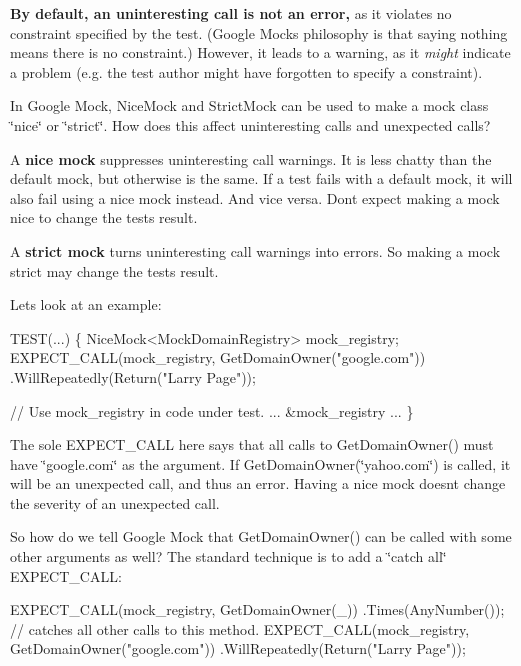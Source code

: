 {\bfseries By default, an uninteresting call is not an error,} as it violates no constraint specified by the test. (Google Mock\textquotesingle{}s philosophy is that saying nothing means there is no constraint.) However, it leads to a warning, as it {\itshape might} indicate a problem (e.\+g. the test author might have forgotten to specify a constraint).

In Google Mock, {\ttfamily Nice\+Mock} and {\ttfamily Strict\+Mock} can be used to make a mock class \char`\"{}nice\char`\"{} or \char`\"{}strict\char`\"{}. How does this affect uninteresting calls and unexpected calls?

A {\bfseries nice mock} suppresses uninteresting call warnings. It is less chatty than the default mock, but otherwise is the same. If a test fails with a default mock, it will also fail using a nice mock instead. And vice versa. Don\textquotesingle{}t expect making a mock nice to change the test\textquotesingle{}s result.

A {\bfseries strict mock} turns uninteresting call warnings into errors. So making a mock strict may change the test\textquotesingle{}s result.

Let\textquotesingle{}s look at an example\+:


\begin{DoxyCode}
TEST(...) \{
  NiceMock<MockDomainRegistry> mock\_registry;
  EXPECT\_CALL(mock\_registry, GetDomainOwner(\textcolor{stringliteral}{"google.com"}))
          .WillRepeatedly(Return(\textcolor{stringliteral}{"Larry Page"}));

  \textcolor{comment}{// Use mock\_registry in code under test.}
  ... &mock\_registry ...
\}
\end{DoxyCode}


The sole {\ttfamily E\+X\+P\+E\+C\+T\+\_\+\+C\+A\+LL} here says that all calls to {\ttfamily Get\+Domain\+Owner()} must have {\ttfamily \char`\"{}google.\+com\char`\"{}} as the argument. If {\ttfamily Get\+Domain\+Owner(\char`\"{}yahoo.\+com\char`\"{})} is called, it will be an unexpected call, and thus an error. Having a nice mock doesn\textquotesingle{}t change the severity of an unexpected call.

So how do we tell Google Mock that {\ttfamily Get\+Domain\+Owner()} can be called with some other arguments as well? The standard technique is to add a \char`\"{}catch all\char`\"{} {\ttfamily E\+X\+P\+E\+C\+T\+\_\+\+C\+A\+LL}\+:


\begin{DoxyCode}
EXPECT\_CALL(mock\_registry, GetDomainOwner(\_))
      .Times(AnyNumber());  \textcolor{comment}{// catches all other calls to this method.}
EXPECT\_CALL(mock\_registry, GetDomainOwner(\textcolor{stringliteral}{"google.com"}))
      .WillRepeatedly(Return(\textcolor{stringliteral}{"Larry Page"}));
\end{DoxyCode}


